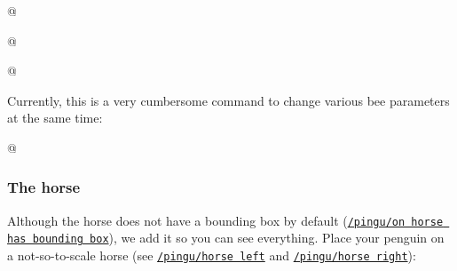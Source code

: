 \documentclass[parskip=half,english,numbers=noenddot,footnotes=nomultiple,oneside]{scrartcl}
\def\lpingu#1{\lstinline[style=lstpingu,language=pingulang]'#1'}
\newcommand*\keyref[2][/pingu/]{\hyperref[pk:#1#2]{\lpingu{#1#2}}}
\begin{document}
{
\def\pingu@color@bee@body{<bee-body-color>}
\begin{tcblisting}{@}
\begin{tikzpicture}
	\pingu[bee, bee mouth=green]
\end{tikzpicture}
\end{tcblisting}
\endsubkeyexplain

\begin{tcblisting}{@}
\begin{tikzpicture}
	\pingu[bee, bee eyes=green]
\end{tikzpicture}
\end{tcblisting}
\endsubkeyexplain

\def\pingu@color@bee{<bee-color>}
\begin{tcblisting}{@}
\begin{tikzpicture}
	\pingu[bee, bee blush=green]
\end{tikzpicture}
\end{tcblisting}
\endsubkeyexplain
}

Currently, this is a very cumbersome command to change various bee parameters at the same time:
\begin{tcblisting}{@}
\begin{tikzpicture}
	\pingu[bee, bee position={1:(0cm,-.09cm){1.33}}]
\end{tikzpicture}
\end{tcblisting}
\endsubkeyexplain

\subsubsection{The horse}
	Although the horse does not have a bounding box by default (\keyref{on horse has bounding box}), we add it so you can see everything.
	Place your penguin on a not-so-to-scale horse (see \keyref{horse left} and \keyref{horse right}):
\begin{tcblisting}{}
\begin{tikzpicture}
	\pingu[on horse=green]
\end{tikzpicture}
\end{tcblisting}
\endshowkeyexplain
\end{document}
